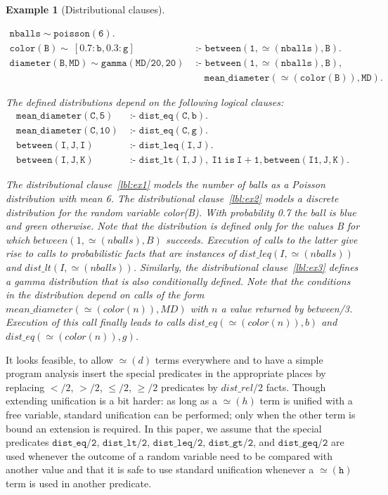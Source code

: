 \documentclass{tlp}
\newtheorem{example}{Example}
\newcommand{\coloneq}{\mbox{ :- }}
\newcommand{\val}{\simeq\!\!}
\begin{document}
\begin{example}[Distributional clauses]
  \label{ex:probrules}

  \begin{align}
    \mathtt{nballs \sim poisson(6)}. 
         & \label{lbl:ex1}\\
    \mathtt{color(B)\sim\ [0.7:b, 0.3:g]} 
         &\coloneq \mathtt{between(1,\val(nballs),B).} \label{lbl:ex2}\\
    \mathtt{ diameter(B,MD)\sim gamma(MD/20,20) }
         &\mathtt{\coloneq  between(1,\val(nballs),B),}\nonumber \\
         &\quad\ \mathtt{mean\_diameter(\val(color(B)),MD).}\label{lbl:ex3}
  \end{align}

  The defined distributions depend on the following logical clauses:
  \begin{align*}
    \mathtt{mean\_diameter(C,5) } & \mathtt{\coloneq dist\_eq(C,b).}\\
    \mathtt{mean\_diameter(C,10) } & \mathtt{\coloneq dist\_eq(C,g). }\\
    \mathtt{ between(I,J,I)} & \mathtt{\coloneq dist\_leq(I,J).} \\
    \mathtt{between(I, J, K)} & \mathtt{\coloneq dist\_lt(I,J), \ I1\ is\ I + 1, between(I1,J,K)}.
  \end{align*}

  The distributional clause~\eqref{lbl:ex1} models the number of balls
  as a Poisson distribution with mean 6. The distributional
  clause~\eqref{lbl:ex2} models a discrete distribution for the random
  variable color(B). With probability 0.7 the ball is blue and green
  otherwise. Note that the distribution is defined only for the values
  B for which $between(1, \val(nballs), B)$ succeeds. Execution of
  calls to the latter give rise to calls to probabilistic facts that
  are instances of $dist\_leq(I,\val(nballs))$ and
  $dist\_lt(I,\val(nballs))$.  Similarly, the distributional
  clause~\eqref{lbl:ex3} defines a gamma distribution that is also
  conditionally defined. Note that the conditions in the distribution
  depend on calls of the form $mean\_diameter(\val(color(n)), MD)$
  with $n$ a value returned by between/3. Execution of this call
  finally leads to calls $dist\_eq(\val(color(n)),b)$ and
  $dist\_eq(\val(color(n)),g)$.
\end{example} 

It looks feasible, to allow $\val(d)$ terms everywhere and to have a
simple program analysis insert the special predicates in the
appropriate places by replacing $</2$, $>/2$, $\leq/2$, $\geq/2$
predicates by $dist\_rel/2$ facts.  Though extending unification is a
bit harder: as long as a $\val(h)$ term is unified with a free
variable, standard unification can be performed; only when the other
term is bound an extension is required.  In this paper, we assume that
the special predicates $\mathtt{dist\_eq/2}$, $\mathtt{dist\_lt/2}$,
$\mathtt{dist\_leq/2}$, $\mathtt{dist\_gt/2}$, and
$\mathtt{dist\_geq/2}$ are used whenever the outcome of a random
variable need to be compared with another value and that it is safe to
use standard unification whenever a $\mathtt{\val(h)}$ term is used in
another predicate.
\end{document}
